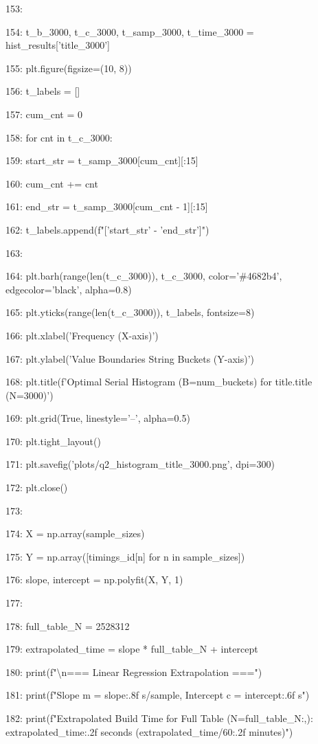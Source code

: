 \documentclass[11pt,a4paper]{article}
\begin{document}
{{{153:

154:     t\_b\_3000, t\_c\_3000, t\_samp\_3000, t\_time\_3000 = hist\_results['title\_3000']

155:     plt.figure(figsize=(10, 8))

156:     t\_labels = []

157:     cum\_cnt = 0

158:     for cnt in t\_c\_3000:

159:         start\_str = t\_samp\_3000[cum\_cnt][:15]

160:         cum\_cnt += cnt

161:         end\_str = t\_samp\_3000[cum\_cnt - 1][:15]

162:         t\_labels.append(f"['{start\_str}' - '{end\_str}']")

163:

164:     plt.barh(range(len(t\_c\_3000)), t\_c\_3000, color='\#4682b4', edgecolor='black', alpha=0.8)

165:     plt.yticks(range(len(t\_c\_3000)), t\_labels, fontsize=8)

166:     plt.xlabel('Frequency (X-axis)')

167:     plt.ylabel('Value Boundaries String Buckets (Y-axis)')

168:     plt.title(f'Optimal Serial Histogram (B={num\_buckets}) for title.title (N=3000)')

169:     plt.grid(True, linestyle='--', alpha=0.5)

170:     plt.tight\_layout()

171:     plt.savefig('plots/q2\_histogram\_title\_3000.png', dpi=300)

172:     plt.close()

173:

174:     X = np.array(sample\_sizes)

175:     Y = np.array([timings\_id[n] for n in sample\_sizes])

176:     slope, intercept = np.polyfit(X, Y, 1)

177:

178:     full\_table\_N = 2528312

179:     extrapolated\_time = slope * full\_table\_N + intercept

180:     print(f"\textbackslash{}n=== Linear Regression Extrapolation ===")

181:     print(f"Slope m = {slope:.8f} s/sample, Intercept c = {intercept:.6f} s")

182:     print(f"Extrapolated Build Time for Full Table (N={full\_table\_N:,}): {extrapolated\_time:.2f} seconds ({extrapolated\_time/60:.2f} minutes)")

}}}
\end{document}
